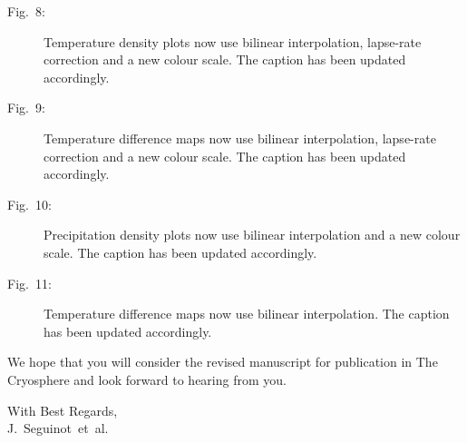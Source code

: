 \documentclass[10pt]{article}
\begin{document}
\begin{description}
\item[Fig.~8:]
  Temperature density plots now use bilinear interpolation, lapse-rate correction and a new colour scale. The caption has been updated accordingly.

\item[Fig.~9:]
  Temperature difference maps now use bilinear interpolation, lapse-rate correction and a new colour scale. The caption has been updated accordingly.

\item[Fig.~10:]
  Precipitation density plots now use bilinear interpolation and a new colour scale. The caption has been updated accordingly.

\item[Fig.~11:]
  Temperature difference maps now use bilinear interpolation. The caption has been updated accordingly.

\end{description}

We hope that you will consider the revised manuscript for publication in The Cryosphere and look forward to hearing from you.

\flushright
With Best Regards,\\
J.~Seguinot~et~al.
\end{document}
